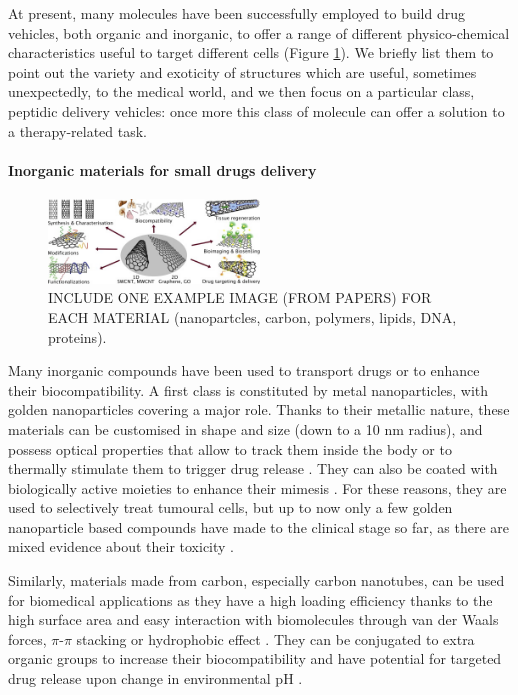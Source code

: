 At present, many molecules have been successfully employed to build drug vehicles, both organic and inorganic, to offer a range of different physico-chemical characteristics useful to target different cells \cite{Hughes2005} (Figure \ref{fig:vehicles}). We briefly list them to point out the variety and exoticity of structures which are useful, sometimes unexpectedly, to the medical world, and we then focus on a particular class, peptidic delivery vehicles: once more this class of molecule can offer a  solution to a therapy-related task.

\paragraph{Inorganic materials for small drugs delivery}

\begin{figure}
\begin{center}
\includegraphics[width = 0.5\textwidth]{1introduction/pics/carbon_review.jpg}
\vspace{0.2cm}
\caption[Materials for drug delivery vehicles]{INCLUDE ONE EXAMPLE IMAGE (FROM PAPERS) FOR EACH MATERIAL (nanopartcles, carbon, polymers, lipids, DNA, proteins).} \label{fig:vehicles}
\end{center}
\end{figure}

Many inorganic compounds have been used to transport drugs or to enhance their biocompatibility. A first class is constituted by metal nanoparticles, with golden nanoparticles covering a major role. Thanks to their metallic nature, these materials can be customised in shape and size (down to a 10 nm radius), and possess optical properties that allow to track them inside the body or to thermally stimulate them to trigger drug release \cite{Boisselier2009}. They can also be coated with biologically active moieties to enhance their mimesis \cite{Singh2018}. For these reasons, they are used to selectively treat tumoural cells, but up to now only a few golden nanoparticle based compounds have made to the clinical stage so far, as there are mixed evidence about their toxicity \cite{Boisselier2009}. 

Similarly, materials made from carbon, especially carbon nanotubes, can be used for biomedical applications as they have a high loading efficiency thanks to the high surface area and easy interaction with biomolecules through van der Waals forces, $\pi$-$\pi$ stacking or hydrophobic effect \cite{Erol2017}. They can be conjugated to extra organic groups to increase their biocompatibility and have potential for targeted drug release upon change in environmental pH \cite{Depan2011}.

